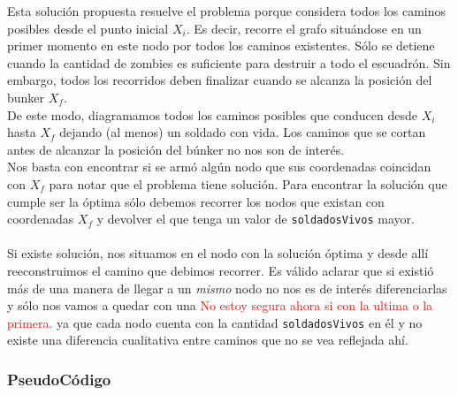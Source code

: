 Esta soluci\'on propuesta resuelve el problema porque considera todos los caminos posibles desde el punto inicial $X_i$. Es decir, recorre el grafo situ\'andose en un primer momento en este nodo por todos los caminos existentes. S\'olo se detiene cuando la cantidad de zombies es suficiente para destruir a todo el escuadr\'on. Sin embargo, todos los recorridos deben finalizar cuando se alcanza la posici\'on del bunker $X_f$.\\

De este modo, diagramamos todos los caminos posibles que conducen desde $X_i$ hasta $X_f$ dejando (al menos) un soldado con vida. Los caminos que se cortan antes de alcanzar la posici\'on del b\'unker no nos son de inter\'es.\\

Nos basta con encontrar si se arm\'o alg\'un nodo que sus coordenadas coincidan con $X_f$ para notar que el problema tiene soluci\'on. Para encontrar la soluci\'on que cumple ser la \'optima s\'olo debemos recorrer los nodos que existan con coordenadas $X_f$ y devolver el que tenga un valor de \texttt{soldadosVivos} mayor.\\
\\

Si existe soluci\'on, nos situamos en el nodo con la soluci\'on \'optima y desde all\'i reeconstruimos el camino que debimos recorrer. Es v\'alido aclarar que si existi\'o m\'as de una manera de llegar a un \emph{mismo} nodo no nos es de inter\'es diferenciarlas y s\'olo  nos vamos a quedar con una \textcolor{red}{No estoy segura ahora si con la ultima o la primera.} ya que cada nodo cuenta con la cantidad \texttt{soldadosVivos} en \'el y no existe una diferencia cualitativa entre caminos que no se vea reflejada ah\'i.\\

\bigskip





\subsubsection*{PseudoC\'odigo}

